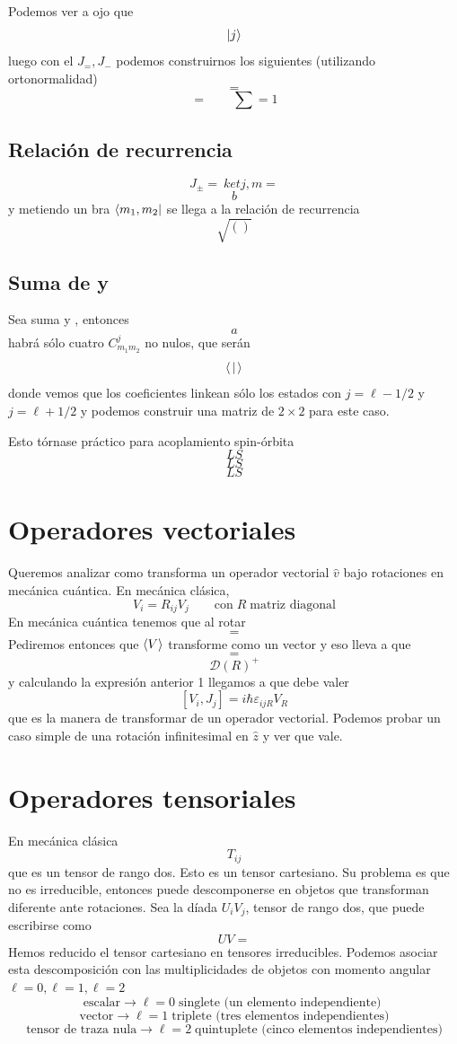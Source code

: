 \documentclass[10pt,oneside]{CBFT_book}
\begin{document}
Podemos ver a ojo que 
\[
	\Ket{j}
\]
luego con el $J_=, J_-$ podemos construirnos los siguientes (utilizando ortonormalidad)
\[
	= 
\]
\[
	= \qquad \sum = 1
\]

\subsection{Relación de recurrencia}

\[
	J_\pm = \ ket{j,m} = 
\]
\[
	b
\]
y metiendo un bra $\Bra{m_1,m_2}$ se llega a la relación de recurrencia
\[
	\sqrt{()}
\]

\subsection{Suma de  y }

Sea suma  y , entonces 
\[
	a
\]
habrá sólo cuatro $C_{m_1 m_2}^j$ no nulos, que serán 
\[
	\Braket{|}
\]
donde vemos que los coeficientes linkean sólo los estados con $j=\ell-1/2$ y $j=\ell+1/2$ y podemos construir una 
matriz de $2\times 2$ para este caso.

Esto tórnase práctico para acoplamiento spin-órbita 
\[
	LS
\]
\[
	LS
\]
\[
	LS
\]

\section{Operadores vectoriales}

Queremos analizar como transforma un operador vectorial $\hat{v}$ bajo rotaciones en mecánica cuántica.
En mecánica clásica,
\[
	V_i = R_{ij} V_j \qquad \text{con} \; R \; \text{matriz diagonal}
\]
En mecánica cuántica tenemos que al rotar
\[
	=
\]
Pediremos entonces que $\Braket{V}$ transforme como un vector y eso lleva a que 
\[
	=
\]
\[
	\mathcal{D}(R)^+
\]
y calculando la expresión anterior 1 llegamos a que debe valer
\[
	[V_i,J_j] =  i\hbar \varepsilon_{ijR}V_R
\]
que es la manera de transformar de un operador vectorial. Podemos probar un caso simple de una rotación infinitesimal 
en $\hat{z}$ y ver que vale.


\section{Operadores tensoriales}

En mecánica clásica 
\[
	T_{ij} 
\]
que es un tensor de rango dos. Esto es un tensor cartesiano. Su problema es que no es irreducible, entonces puede 
descomponerse en objetos que transforman diferente ante rotaciones. Sea la díada $U_iV_j$, tensor de rango dos, que 
puede escribirse como 
\[
	UV =
\]
Hemos reducido el tensor cartesiano en tensores irreducibles. Podemos asociar esta descomposición con las 
multiplicidades de objetos con momento angular $\ell=0, \ell=1, \ell=2$
\[
	\text{escalar} \longrightarrow \ell=0 \; \text{singlete (un elemento independiente) }
\]
\[
	\text{vector} \longrightarrow \ell=1 \; \text{triplete (tres elementos independientes)}
\]
\[
	\text{tensor de traza nula} \longrightarrow \ell=2 \; \text{quintuplete (cinco elementos 
independientes)}
\]
\end{document}
